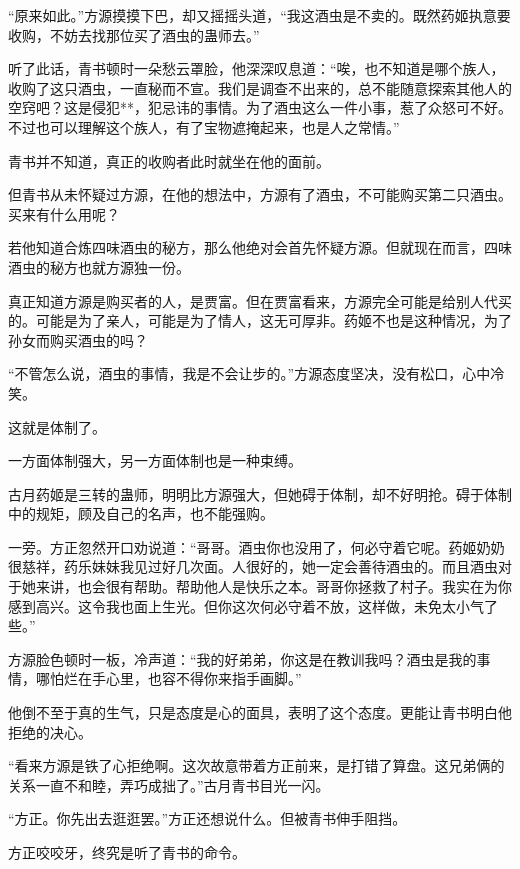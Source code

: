 
\begin{this_body}

“原来如此。”方源摸摸下巴，却又摇摇头道，“我这酒虫是不卖的。既然药姬执意要收购，不妨去找那位买了酒虫的蛊师去。”

听了此话，青书顿时一朵愁云罩脸，他深深叹息道：“唉，也不知道是哪个族人，收购了这只酒虫，一直秘而不宣。我们是调查不出来的，总不能随意探索其他人的空窍吧？这是侵犯**，犯忌讳的事情。为了酒虫这么一件小事，惹了众怒可不好。不过也可以理解这个族人，有了宝物遮掩起来，也是人之常情。”

青书并不知道，真正的收购者此时就坐在他的面前。

但青书从未怀疑过方源，在他的想法中，方源有了酒虫，不可能购买第二只酒虫。买来有什么用呢？

若他知道合炼四味酒虫的秘方，那么他绝对会首先怀疑方源。但就现在而言，四味酒虫的秘方也就方源独一份。

真正知道方源是购买者的人，是贾富。但在贾富看来，方源完全可能是给别人代买的。可能是为了亲人，可能是为了情人，这无可厚非。药姬不也是这种情况，为了孙女而购买酒虫的吗？

“不管怎么说，酒虫的事情，我是不会让步的。”方源态度坚决，没有松口，心中冷笑。

这就是体制了。

一方面体制强大，另一方面体制也是一种束缚。

古月药姬是三转的蛊师，明明比方源强大，但她碍于体制，却不好明抢。碍于体制中的规矩，顾及自己的名声，也不能强购。

一旁。方正忽然开口劝说道：“哥哥。酒虫你也没用了，何必守着它呢。药姬奶奶很慈祥，药乐妹妹我见过好几次面。人很好的，她一定会善待酒虫的。而且酒虫对于她来讲，也会很有帮助。帮助他人是快乐之本。哥哥你拯救了村子。我实在为你感到高兴。这令我也面上生光。但你这次何必守着不放，这样做，未免太小气了些。”

方源脸色顿时一板，冷声道：“我的好弟弟，你这是在教训我吗？酒虫是我的事情，哪怕烂在手心里，也容不得你来指手画脚。”

他倒不至于真的生气，只是态度是心的面具，表明了这个态度。更能让青书明白他拒绝的决心。

“看来方源是铁了心拒绝啊。这次故意带着方正前来，是打错了算盘。这兄弟俩的关系一直不和睦，弄巧成拙了。”古月青书目光一闪。

“方正。你先出去逛逛罢。”方正还想说什么。但被青书伸手阻挡。

方正咬咬牙，终究是听了青书的命令。


\end{this_body}
